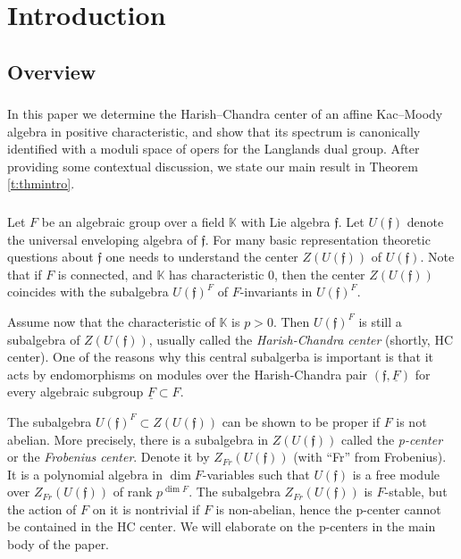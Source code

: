 \documentclass{amsart}
\theoremstyle{definition}
\newcommand{\sss}{\subsubsection{}}
\newcommand{\ff}{\mathfrak{f}}
\newcommand{\bK}{\mathbb{K}}
\renewcommand{\bK}{\mathbb{K}} %
\numberwithin{equation}{section}
\begin{document}
\maketitle
\setcounter{tocdepth}{1}
 \tableofcontents  



\section{Introduction}

\subsection{Overview}




\sss {In this paper we determine the Harish--Chandra center of an affine Kac--Moody algebra in positive characteristic, and show that its spectrum is canonically identified with a moduli space of opers for the Langlands dual group. After providing some contextual discussion, we state our main result in Theorem \ref{t:thmintro}.  
}



\sss \label{sss:intro1} Let $F$ be an algebraic group over a field $\bK$ with Lie algebra $\ff$. Let $U(\ff)$ denote the universal enveloping algebra
of $\ff$. For many basic representation theoretic questions about $\ff$ one needs to understand the center $Z(U(\ff))$ of  $U(\ff)$. Note that if $F$ is connected, and $\bK$ has characteristic $0$, then the center $Z(U(\ff))$ coincides with the subalgebra $U(\ff)^F$ of $F$-invariants in $U(\ff)^F$. 

Assume now that the characteristic of $\bK$ is $p>0$. Then  $U(\ff)^F$ is still a subalgebra of $Z(U(\ff))$, usually called the {\it Harish-Chandra center} (shortly, HC center).
One of the reasons why this central subalgerba is important is that it acts by endomorphisms on modules over the Harish-Chandra pair 
$(\ff, \underline{F})$ for every algebraic subgroup $\underline{F}\subset F$. 

The subalgebra $U(\ff)^F\subset Z(U(\ff))$ can be shown to be proper if $F$ is not abelian. More precisely, there is a subalgebra in $Z(U(\ff))$ called the {\it p-center} or the {\it Frobenius center}. Denote it by $Z_{Fr}(U(\ff))$ (with ``Fr'' from Frobenius). It is a polynomial algebra in $\dim F$-variables such that $U(\ff)$ is a free module over $Z_{Fr}(U(\ff))$ of rank $p^{\dim F}$. The subalgebra $Z_{Fr}(U(\ff))$ is $F$-stable, but the action of $F$ on it is nontrivial if $F$ is non-abelian, hence the p-center cannot be contained in the HC center. We will elaborate on the p-centers in the main body of the paper. 
\end{document}
